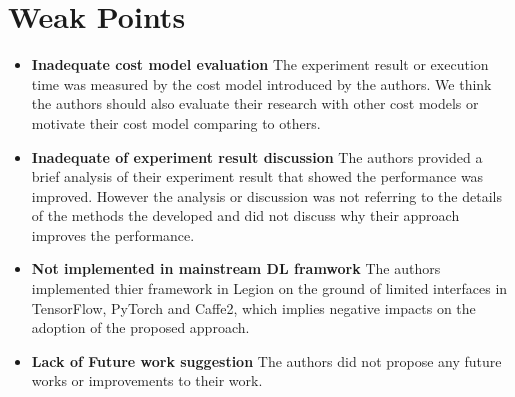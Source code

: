 \documentclass[10pt]{proc}
\begin{document}
\section{Weak Points}
\begin{itemize}
	\item \textbf{Inadequate cost model evaluation} The experiment result or execution time was measured by the cost model introduced by the authors. We think the authors should also evaluate their research with other cost models or motivate their cost model comparing to others.
	\item \textbf{Inadequate of experiment result discussion} The authors provided a brief analysis of their experiment result that showed the performance was improved. However the analysis or discussion was not referring to the details of the methods the developed and did not discuss why their approach improves the performance.
	\item \textbf{Not implemented in mainstream DL framwork} The authors implemented thier framework in Legion on the ground of limited interfaces in TensorFlow, PyTorch and Caffe2, which implies negative impacts on the adoption of the proposed approach.
	\item \textbf{Lack of Future work suggestion} The authors did not propose any future works or improvements to their work.
\end{itemize}
\end{document}
